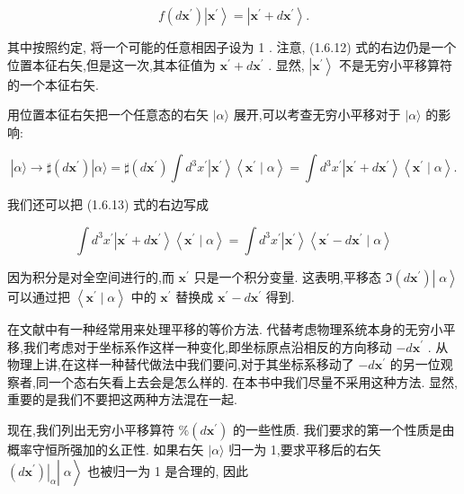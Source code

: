 \documentclass[lang=cn,newtx,10pt,scheme=chinese,thmcnt=section]{elegantbook}
\begin{document}
$$
f\left( {d{\mathbf{x}}^{\prime }}\right) \left| {\mathbf{x}}^{\prime }\right\rangle = \left| {{\mathbf{x}}^{\prime } + d{\mathbf{x}}^{\prime }}\right\rangle . \tag{1.6.12}
$$

其中按照约定, 将一个可能的任意相因子设为 1 . 注意, (1.6.12) 式的右边仍是一个位置本征右矢,但是这一次,其本征值为 ${\mathbf{x}}^{\prime } + d{\mathbf{x}}^{\prime }$ . 显然, $\left| {\mathbf{x}}^{\prime }\right\rangle$ 不是无穷小平移算符的一个本征右矢.

用位置本征右矢把一个任意态的右矢 $|\alpha \rangle$ 展开,可以考查无穷小平移对于 $|\alpha \rangle$ 的影响:

$$
\left| {\alpha \rangle \rightarrow \sharp \left( {d{\mathbf{x}}^{\prime }}\right) }\right| \alpha \rangle = \sharp \left( {d{\mathbf{x}}^{\prime }}\right) \int {d}^{3}{x}^{\prime }\left| {\mathbf{x}}^{\prime }\right\rangle \left\langle {{\mathbf{x}}^{\prime } \mid \alpha }\right\rangle = \int {d}^{3}{x}^{\prime }\left| {{\mathbf{x}}^{\prime } + d{\mathbf{x}}^{\prime }}\right\rangle \left\langle {{\mathbf{x}}^{\prime } \mid \alpha }\right\rangle . \tag{1.6.13}
$$

我们还可以把 (1.6.13) 式的右边写成

$$
\int {d}^{3}{x}^{\prime }\left| {{\mathbf{x}}^{\prime } + d{\mathbf{x}}^{\prime }}\right\rangle \left\langle {{\mathbf{x}}^{\prime } \mid \alpha }\right\rangle = \int {d}^{3}{x}^{\prime }\left| {\mathbf{x}}^{\prime }\right\rangle \left\langle {{\mathbf{x}}^{\prime } - d{\mathbf{x}}^{\prime } \mid \alpha }\right\rangle \tag{1.6.14}
$$

因为积分是对全空间进行的,而 ${\mathbf{x}}^{\prime }$ 只是一个积分变量. 这表明,平移态 $\left. {\left. {\Im \left( {d{\mathbf{x}}^{\prime }}\right) }\right| \;\alpha }\right\rangle$ 可以通过把 $\left\langle {{\mathbf{x}}^{\prime } \mid \alpha }\right\rangle$ 中的 ${\mathbf{x}}^{\prime }$ 替换成 ${\mathbf{x}}^{\prime } - d{\mathbf{x}}^{\prime }$ 得到.

在文献中有一种经常用来处理平移的等价方法. 代替考虑物理系统本身的无穷小平移,我们考虑对于坐标系作这样一种变化,即坐标原点沿相反的方向移动 $- d{\mathbf{x}}^{\prime }$ . 从物理上讲,在这样一种替代做法中我们要问,对于其坐标系移动了 $- d{\mathbf{x}}^{\prime }$ 的另一位观察者,同一个态右矢看上去会是怎么样的. 在本书中我们尽量不采用这种方法. 显然, 重要的是我们不要把这两种方法混在一起.

现在,我们列出无穷小平移算符 $\% \left( {d{\mathbf{x}}^{\prime }}\right)$ 的一些性质. 我们要求的第一个性质是由概率守恒所强加的幺正性. 如果右矢 $|\alpha \rangle$ 归一为 1,要求平移后的右矢 $\left. {\left. {\left. \left( d{\mathbf{x}}^{\prime }\right) \right| }_{\alpha }\right| \;\alpha }\right\rangle$ 也被归一为 1 是合理的, 因此
\end{document}
